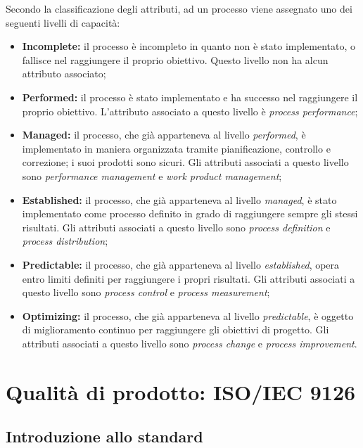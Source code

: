\documentclass[openany,12pt,a4paper]{report}
\begin{document}
\noindent Secondo la classificazione degli attributi, ad un processo viene assegnato uno dei seguenti livelli di capacità:

\begin{itemize}
    \item \textbf{Incomplete:} il processo è incompleto in quanto non è stato implementato, o fallisce nel raggiungere il proprio obiettivo. Questo livello non ha alcun attributo associato;
    \item \textbf{Performed:} il processo è stato implementato e ha successo nel raggiungere il proprio obiettivo. L'attributo associato a questo livello è \textit{process performance};
    \item \textbf{Managed:} il processo, che già apparteneva al livello \textit{performed}, è implementato in maniera organizzata tramite pianificazione, controllo e correzione; i suoi prodotti sono sicuri. Gli attributi associati a questo livello sono \textit{performance management} e \textit{work product management};
    \item \textbf{Established:} il processo, che già apparteneva al livello \textit{managed}, è stato implementato come processo definito in grado di raggiungere sempre gli stessi risultati. Gli attributi associati a questo livello sono \textit{process definition} e \textit{process distribution};
    \item \textbf{Predictable:} il processo, che già apparteneva al livello \textit{established}, opera entro limiti definiti per raggiungere i propri risultati. Gli attributi associati a questo livello sono \textit{process control} e \textit{process measurement};
    \item \textbf{Optimizing:} il processo, che già apparteneva al livello \textit{predictable}, è oggetto di miglioramento continuo per raggiungere gli obiettivi di progetto. Gli attributi associati a questo livello sono \textit{process change} e \textit{process improvement}.
\end{itemize}

    
\section{Qualità di prodotto: ISO/IEC 9126}    

\subsection{Introduzione allo standard}
\end{document}
